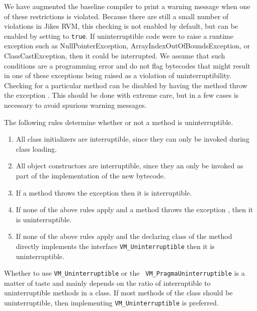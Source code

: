 We have augmented the baseline compiler to print a warning message
when one of these restrictions is violated.  Because there are still a
small number of violations in Jikes RVM, this checking is not enabled
by default, but can be enabled by setting  to  \texttt{true}. 
If uninterruptible code were to raise a runtime exception such
as NullPointerException, ArrayIndexOutOfBoundsException, or
ClassCastException, then it could be interrupted.  We assume that such
conditions are a programming error and do not flag bytecodes that
might result in one of these exceptions being raised as a violation of
uninterruptibility. Checking for a particular method can be disabled
by having the method throw the exception .  This should be done with extreme
care, but in a few cases is necessary to avoid spurious warning
messages. 

The following rules determine whether or not a method is
uninterruptible.
\begin{enumerate}
\item{} All class initializers are interruptible, since they
can only be invoked during class loading.
\item{} All object constructors are interruptible, since they an
only be invoked as part of the implementation of the new bytecode.
\item{} If a method throws the exception  then it is interruptible.
\item{} If none of the above rules apply and a method throws the
exception 
, then it is uninterruptible.
\item{} If none of the above rules apply and the declaring class of
the method directly implements the interface {\tt VM\_\-Un\-in\-ter\-rup\-ti\-ble}
then it is uninterruptible.
\end{enumerate}
Whether to use {\tt VM\_Uninterruptible} or the {\tt
VM\_PragmaUninterruptible} is a matter of taste and mainly depends on
the ratio of interruptible to uninterruptible methods in a class.  If
most methods of the class should be uninterruptible, then implementing
{\tt VM\_Uninterruptible} is preferred. 

